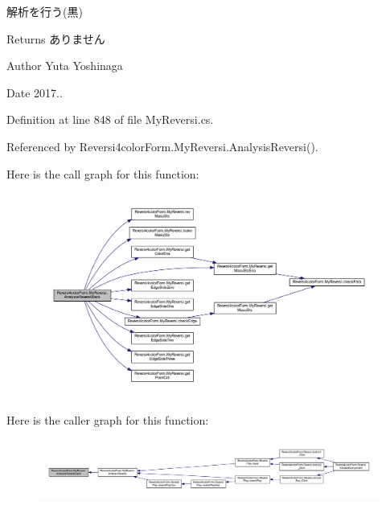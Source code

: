 解析を行う(黒) 

\begin{DoxyReturn}{Returns}
ありません 
\end{DoxyReturn}
\begin{DoxyAuthor}{Author}
Yuta Yoshinaga 
\end{DoxyAuthor}
\begin{DoxyDate}{Date}
2017.. 
\end{DoxyDate}


Definition at line 848 of file My\+Reversi.\+cs.



Referenced by Reversi4color\+Form.\+My\+Reversi.\+Analysis\+Reversi().

Here is the call graph for this function\+:\nopagebreak
\begin{figure}[H]
\begin{center}
\leavevmode
\includegraphics[width=350pt]{class_reversi4color_form_1_1_my_reversi_ae4c0b7e9a3cedba827facf1d96b654f0_cgraph}
\end{center}
\end{figure}
Here is the caller graph for this function\+:\nopagebreak
\begin{figure}[H]
\begin{center}
\leavevmode
\includegraphics[width=350pt]{class_reversi4color_form_1_1_my_reversi_ae4c0b7e9a3cedba827facf1d96b654f0_icgraph}
\end{center}
\end{figure}
\mbox{\label{class_reversi4color_form_1_1_my_reversi_a07c18a7adbcc3bd0993673f0a8f63c85}} 
